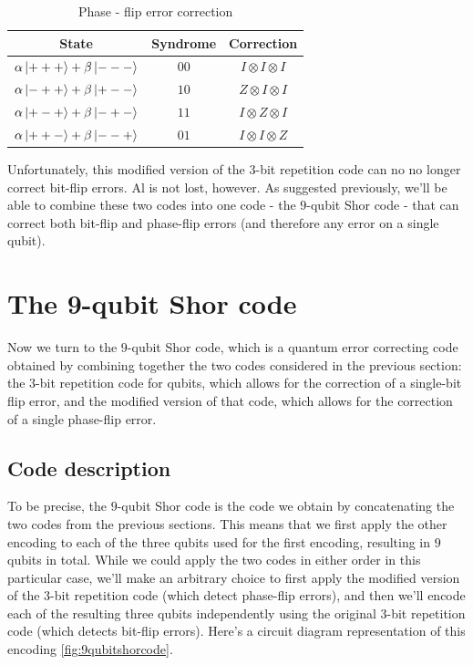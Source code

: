 \documentclass[12pt, oneside]{book}
\theoremstyle{definition}
\theoremstyle{definition}
\theoremstyle{remark}
\begin{document}
\begin{table}[ht]
    \centering
    \begin{tabular}{|c|c|c|}
    \hline
State         & Syndrome & Correction \\
\hline
        $\alpha\ket{+++}+\beta\ket{---}$ & $00$ & $I\otimes I\otimes I$ \\
        \hline
       $\alpha\ket{-++}+\beta\ket{+--}$  & $10$ & $Z\otimes I\otimes I$\\
       \hline
       $\alpha\ket{+-+}+\beta\ket{-+-}$  & $11$ & $I\otimes Z\otimes I$ \\
       \hline
$\alpha\ket{++-}+\beta\ket{--+}$         & $01$  & $I\otimes I\otimes Z$ \\
\hline
    \end{tabular}
    \caption{Phase - flip error correction}
    \label{tab:phasefliperror}
\end{table}
Unfortunately, this modified version of the $3$-bit repetition code can no no longer correct bit-flip errors. Al is not lost, however. As suggested previously, we'll be able to combine these two codes into one code - the $9$-qubit Shor code - that can correct both bit-flip and phase-flip errors (and therefore any error on a single qubit).

\section{The 9-qubit Shor code}
Now we turn to the $9$-qubit Shor code, which is a quantum error correcting code obtained by combining together the two codes considered in the previous section: the $3$-bit repetition code for qubits, which allows for the correction of a single-bit flip error, and the modified version of that code, which allows for the correction of a single phase-flip error.
\subsection{Code description}
To be precise, the $9$-qubit Shor code is the code we obtain by concatenating the two codes from the previous sections. This means that we first apply the other encoding to each of the three qubits used for the first encoding, resulting in $9$ qubits in total. While we could apply the two codes in either order in this particular case, we'll make an arbitrary choice to first apply the modified version of the $3$-bit repetition code (which detect phase-flip errors), and then we'll encode each of the resulting three qubits independently using the original $3$-bit repetition code (which detects bit-flip errors).
Here's a circuit diagram representation of this encoding \ref{fig:9qubitshorcode}.
\end{document}
